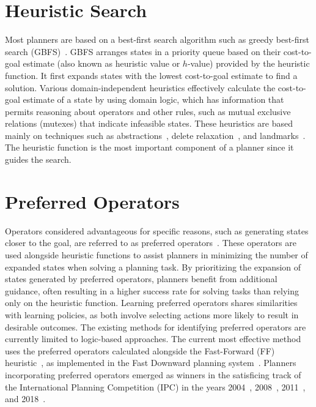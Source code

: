 \documentclass[ppgc,diss,english]{iiufrgs}
\begin{document}
\section{Heuristic Search}
\label{sec:intro-heuristic-search}
Most planners are based on a best-first search algorithm such as greedy best-first search (GBFS)~\cite{Doran.Michie/1966}. GBFS arranges states in a priority queue based on their cost-to-goal estimate (also known as heuristic value or $h$-value) provided by the heuristic function. It first expands states with the lowest cost-to-goal estimate to find a solution. Various domain-independent heuristics effectively calculate the cost-to-goal estimate of a state by using domain logic, which has information that permits reasoning about operators and other rules, such as mutual exclusive relations (mutexes) that indicate infeasible states. These heuristics are based mainly on techniques such as abstractions~\cite{Culberson.Schaeffer/1998}, delete relaxation~\cite{Hoffmann.Nebel/2001}, and landmarks~\cite{Hoffmann.etal/2004,Helmert.Domshlak/2009}. The heuristic function is the most important component of a planner since it guides the search.

\section{Preferred Operators}
\label{sec:intro-preferred-ops}
Operators considered advantageous for specific reasons, such as generating states closer to the goal, are referred to as preferred operators~\cite{Helmert/2006,Richter.Helmert/2009}. These operators are used alongside heuristic functions to assist planners in minimizing the number of expanded states when solving a planning task.
By prioritizing the expansion of states generated by preferred operators, planners benefit from additional guidance, often resulting in a higher success rate for solving tasks than relying only on the heuristic function. Learning preferred operators shares similarities with learning policies, as both involve selecting actions more likely to result in desirable outcomes. The existing methods for identifying preferred operators are currently limited to logic-based approaches. The current most effective method uses the preferred operators calculated alongside the Fast-Forward (FF) heuristic~\cite{Hoffmann.Nebel/2001}, as implemented in the Fast Downward planning system~\cite{Helmert/2006}. Planners incorporating preferred operators emerged as winners in the satisficing track of the International Planning Competition (IPC) in the years 2004~\cite{Helmert/2006}, 2008~\cite{Richter.lama.etal/2010}, 2011~\cite{Richter.lama.etal/2011}, and 2018~\cite{Seipp-fast.etal/2018}.
\end{document}
